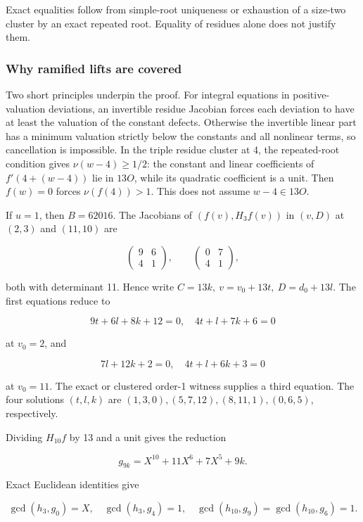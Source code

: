 \documentclass[
  british,
  10pt,
]{article}
\begin{document}
Exact equalities follow from simple-root uniqueness or exhaustion of a
size-two cluster by an exact repeated root. Equality of residues alone
does not justify them.

\subsubsection{Why ramified lifts are
covered}\label{why-ramified-lifts-are-covered}

Two short principles underpin the proof. For integral equations in
positive-valuation deviations, an invertible residue Jacobian forces
each deviation to have at least the valuation of the constant defects.
Otherwise the invertible linear part has a minimum valuation strictly
below the constants and all nonlinear terms, so cancellation is
impossible. In the triple residue cluster at 4, the repeated-root
condition gives \(\nu(w-4)\ge1/2\): the constant and linear coefficients
of \(f'(4+(w-4))\) lie in \(13O\), while its quadratic coefficient is a
unit. Then \(f(w)=0\) forces \(\nu(f(4))>1\). This does not assume
\(w-4\in13O\).

If \(u=1\), then \(B=62016\). The Jacobians of \((f(v),H_3f(v))\) in
\((v,D)\) at \((2,3)\) and \((11,10)\) are

\[
\begin{pmatrix}9&6\\4&1\end{pmatrix},\qquad
\begin{pmatrix}0&7\\4&1\end{pmatrix},
\]

both with determinant 11. Hence write \(C=13k,\ v=v_0+13t,\ D=d_0+13l\).
The first equations reduce to

\[
9t+6l+8k+12=0,\quad4t+l+7k+6=0
\]

at \(v_0=2\), and

\[
7l+12k+2=0,\quad4t+l+6k+3=0
\]

at \(v_0=11\). The exact or clustered order-1 witness supplies a third
equation. The four solutions \((t,l,k)\) are
\((1,3,0),(5,7,12),(8,11,1),(0,6,5)\), respectively.

Dividing \(H_{10}f\) by 13 and a unit gives the reduction

\[
g_{9k}=X^{10}+11X^6+7X^5+9k.
\]

Exact Euclidean identities give

\[
\gcd(h_3,g_0)=X,\quad\gcd(h_3,g_4)=1,\quad
\gcd(h_{10},g_9)=\gcd(h_{10},g_6)=1.
\]
\end{document}
